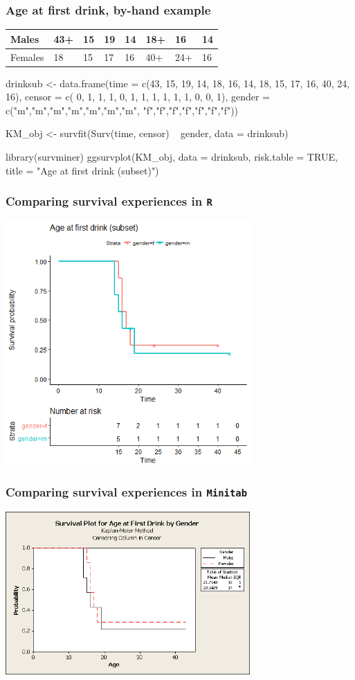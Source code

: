 \begin{frame}[fragile]
\frametitle{Age at first drink, by-hand example}
\begin{tabular}{l|lllllll}
Males & 43+ & 15 & 19 & 14 & 18+ & 16 & 14\\ \hline
Females & 18 & 15 & 17 & 16 & 40+ & 24+ & 16
\end{tabular}
\begin{Rcode}{-.05}
drinksub <- data.frame(time   = c(43, 15, 19, 14, 18, 16, 14,
                                  18, 15, 17, 16, 40, 24, 16),
                       censor = c( 0,  1,  1, 1,   0,  1,  1,
                                   1,  1,  1, 1,   0,  0,  1),
                       gender = c("m","m","m","m","m","m","m",
                                  "f","f","f","f","f","f","f"))

KM_obj <- survfit(Surv(time, censor) ~ gender, data = drinksub)

library(survminer)
ggsurvplot(KM_obj, data = drinksub,
           risk.table = TRUE,
           title = "Age at first drink (subset)")
\end{Rcode}
\end{frame}

\begin{frame}
\frametitle{Comparing survival experiences in \texttt{R}}
\includegraphics[width=0.70\textwidth]{Figures/KM_drinksub_gender.png}
\end{frame}

\begin{frame}
\frametitle{Comparing survival experiences in \texttt{Minitab}}
\includegraphics[width=0.70\textwidth]{Figures/km_gender_drink_sub_mt.jpg}
\end{frame}


